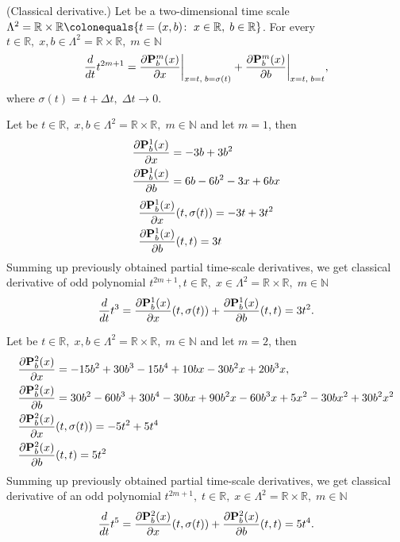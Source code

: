 \begin{cor}
    \label{derivative_case}
    (Classical derivative.)
    Let be a two-dimensional time scale
    $\Lambda^2 = \mathbb{R} \times \mathbb{R} \colonequals \{t=(x, b) \colon \; x\in \mathbb{R}, \; b\in\mathbb{R} \}$.
    For every $t\in\mathbb{R}, \; x,b\in \Lambda^2 = \mathbb{R} \times \mathbb{R}, \; m\in\mathbb{N}$
    \[
        \derivative{t^{2m+1}}{t}
        = \pderivative{\polynomialP{m}{b}{x}}{x} \bigg |_{x = t, \; b = \sigma(t)}
        + \pderivative{\polynomialP{m}{b}{x}}{b} \bigg |_{x = t, \; b = t},
    \]
    where $\sigma(t) = t + \Delta t, \; \Delta t \to 0.$
\end{cor}
\begin{examp}
    Let be $t\in\mathbb{R}, \; x,b\in \Lambda^2 = \mathbb{R} \times \mathbb{R}, \; m\in\mathbb{N}$ and let $m=1$, then
    \begin{align*}
        \pderivative{\polynomialP{1}{b}{x}}{x} &= -3 b + 3 b^2 \\
        \pderivative{\polynomialP{1}{b}{x}}{b} &= 6 b - 6 b^2 - 3 x + 6 b x
    \end{align*}
    \begin{align*}
        &\pderivative{\polynomialP{1}{b}{x}}{x}(t, \sigma(t)) = -3t + 3t^2 \\
        &\pderivative{\polynomialP{1}{b}{x}}{b} (t, t) = 3t
    \end{align*}
    Summing up previously obtained partial time-scale derivatives, we get classical derivative of odd polynomial
    $t^{2m+1}, t\in\mathbb{R}, \; x\in \Lambda^2 = \mathbb{R} \times \mathbb{R}, \; m\in\mathbb{N}$
    \[
        \derivative{t^3}{t}
        = \pderivative{\polynomialP{1}{b}{x}}{x}(t, \sigma(t)) + \pderivative{\polynomialP{1}{b}{x}}{b}(t, t)
        = 3t^2.
    \]
\end{examp}
\begin{examp}
    Let be $t\in\mathbb{R}, \; x,b\in \Lambda^2 = \mathbb{R} \times \mathbb{R}, \; m\in\mathbb{N}$ and let $m=2$, then
    \begin{align*}
        &\pderivative{\polynomialP{2}{b}{x}}{x} = -15 b^2 + 30 b^3 - 15 b^4 + 10 b x - 30 b^2 x + 20 b^3 x, \\
        &\pderivative{\polynomialP{2}{b}{x}}{b} = 30 b^2 - 60 b^3 + 30 b^4 - 30 b x + 90 b^2 x - 60 b^3 x + 5 x^2 - 30 b x^2
        + 30 b^2 x^2 \\
        &\pderivative{\polynomialP{2}{b}{x}}{x}(t, \sigma(t)) = -5 t^2 + 5 t^4 \\
        &\pderivative{\polynomialP{2}{b}{x}}{b} (t, t) = 5 t^2
    \end{align*}
    Summing up previously obtained partial time-scale derivatives, we get classical derivative of an odd polynomial
    $t^{2m+1}, \; t\in\mathbb{R}, \; x\in \Lambda^2 = \mathbb{R} \times \mathbb{R}, \; m\in\mathbb{N}$
    \[
        \derivative{t^5}{t}
        = \pderivative{\polynomialP{2}{b}{x}}{x}(t, \sigma(t)) + \pderivative{\polynomialP{2}{b}{x}}{b}(t, t)
        = 5t^4.
    \]
\end{examp}